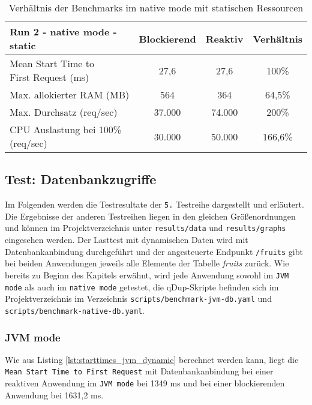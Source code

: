 \begin{table}[ht!]
  \begin{tabular}{|l | c | c | c|}
    \hline
    Run 2 - native mode - static & Blockierend & Reaktiv & Verhältnis \\
    \hline
    \makecell[l]{Mean Start Time to                                   \\ First Request (ms)} &   27,6    &  27,6  &   100\%   \\
    \hline
    Max. allokierter RAM (MB)    & 564         & 364     & 64,5\%     \\
    \hline
    Max. Durchsatz (req/sec)     & 37.000      & 74.000  & 200\%      \\
    \hline
    \makecell[l]{CPU Auslastung bei 100\%                             \\ (req/sec)} & 30.000 & 50.000 & 166,6\%  \\
    \hline
  \end{tabular}
  \caption{Verhältnis der Benchmarks im native mode mit statischen Ressourcen}
  \label{table:static_native_measurement_results}
\end{table}
\newpage
\subsection{Test: Datenbankzugriffe}
\label{section:datenbankzugriffe}
Im Folgenden werden die Testresultate der \verb|5.| Testreihe dargestellt und erläutert.
Die Ergebnisse der anderen Testreihen liegen in den gleichen Größenordnungen und können im Projektverzeichnis unter \verb|results/data| und \verb|results/graphs| eingesehen werden.
Der Lasttest mit dynamischen Daten wird mit Datenbankanbindung durchgeführt und der angesteuerte Endpunkt \verb|/fruits| gibt bei beiden Anwendungen
jeweils alle Elemente der Tabelle \textit{fruits} zurück. Wie bereits zu Beginn des Kapitels erwähnt, wird jede Anwendung sowohl im \verb|JVM mode| als auch im
\verb|native mode| getestet, die qDup-Skripte befinden sich im Projektverzeichnis im Verzeichnis \verb|scripts/benchmark-jvm-db.yaml| und
\verb|scripts/benchmark-native-db.yaml|.

\subsubsection{JVM mode}
\label{subsubsec:dynamic_jvm_mode}
Wie aus Listing \ref{lst:starttimes_jvm_dynamic} berechnet werden kann, liegt die \verb|Mean Start Time to First Request|
mit Datenbankanbindung bei einer reaktiven Anwendung im \verb|JVM mode| bei 1349 ms und bei einer
blockierenden Anwendung bei 1631,2 ms.

